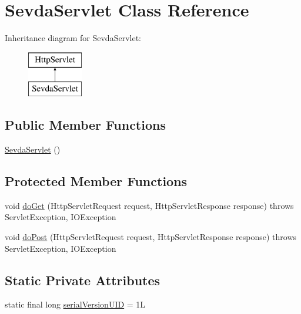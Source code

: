 \hypertarget{class_sevda_servlet}{}\section{Sevda\+Servlet Class Reference}
\label{class_sevda_servlet}
Inheritance diagram for Sevda\+Servlet\+:\begin{figure}[H]
\begin{center}
\leavevmode
\includegraphics[height=2.000000cm]{class_sevda_servlet}
\end{center}
\end{figure}
\subsection*{Public Member Functions}
\begin{DoxyCompactItemize}
\item 
\hyperlink{class_sevda_servlet_aaeda9393ad4f44173c9a1f6dca081898}{Sevda\+Servlet} ()
\end{DoxyCompactItemize}
\subsection*{Protected Member Functions}
\begin{DoxyCompactItemize}
\item 
void \hyperlink{class_sevda_servlet_a2f43bf74a008d49bd9f29d666eac5b38}{do\+Get} (Http\+Servlet\+Request request, Http\+Servlet\+Response response)  throws Servlet\+Exception, I\+O\+Exception 
\item 
void \hyperlink{class_sevda_servlet_a7e577ac04fc5fc33e8db8d496a5e4350}{do\+Post} (Http\+Servlet\+Request request, Http\+Servlet\+Response response)  throws Servlet\+Exception, I\+O\+Exception 
\end{DoxyCompactItemize}
\subsection*{Static Private Attributes}
\begin{DoxyCompactItemize}
\item 
static final long \hyperlink{class_sevda_servlet_a63f8a545fa51c2865b24cc3114ca2f82}{serial\+Version\+U\+ID} = 1L
\end{DoxyCompactItemize}


